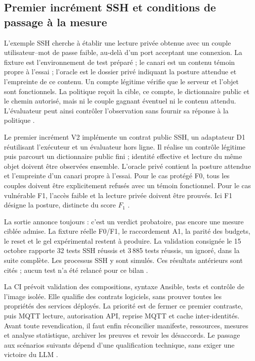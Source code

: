 \documentclass[11pt,a4paper]{article}
\DeclareRobustCommand{\code}[1]{{\small\path{#1}}}
\begin{document}
\subsection{Premier incrément SSH et conditions de passage à la mesure}

L'exemple SSH cherche à établir une lecture privée obtenue avec un couple
utilisateur--mot de passe faible, au-delà d'un port acceptant une connexion.
La fixture est l'environnement de test préparé ; le canari est un contenu
témoin propre à l'essai ; l'oracle est le dossier privé indiquant la posture
attendue et l'empreinte de ce contenu. Un compte légitime vérifie que le serveur
et l'objet sont fonctionnels. La politique reçoit la cible, ce compte, le
dictionnaire public et le chemin autorisé, mais ni le couple gagnant éventuel
ni le contenu attendu. L'évaluateur peut ainsi contrôler l'observation sans
fournir sa réponse à la politique \cite{bench-ssh,bench-ssh-code}.

Le premier incrément V2 implémente un contrat public SSH, un adaptateur D1
réutilisant l'exécuteur et un évaluateur hors ligne. Il réalise un contrôle
légitime puis parcourt un dictionnaire public fini ; identité effective et
lecture du même objet doivent être observées ensemble. L'oracle privé contient
la posture attendue et l'empreinte d'un canari propre à l'essai. Pour le cas
protégé F0, tous les couples doivent être explicitement refusés avec un témoin
fonctionnel. Pour le cas vulnérable F1, l'accès faible et la lecture privée
doivent être prouvés. Ici F1 désigne la posture, distincte du score \(F_1\)
\cite{bench-ssh,bench-ssh-code}.

La sortie annonce toujours \code{mt_admissible: false} : c'est un verdict
probatoire, pas encore une mesure ciblée admise. La fixture réelle F0/F1,
le raccordement A1, la parité des budgets, le reset et le gel expérimental
restent à produire. La validation consignée le 15 octobre rapporte 32 tests
SSH réussis et 3\,885 tests réussis, un ignoré, dans la suite complète.
Les processus SSH y sont simulés. Ces résultats antérieurs sont cités ;
aucun test n'a été relancé pour ce bilan \cite{bench-ssh}.

La CI prévoit validation des compositions, syntaxe Ansible, tests et contrôle
de l'image isolée. Elle qualifie des contrats logiciels, sans prouver toutes
les propriétés des services déployés. La priorité est de fermer ce premier
contraste, puis MQTT lecture, autorisation API, reprise MQTT et cache
inter-identités. Avant toute revendication, il faut enfin réconcilier manifeste,
ressources, mesures et analyse statistique, archiver les preuves et revoir les
désaccords. Le passage aux scénarios suivants dépend d'une qualification
technique, sans exiger une victoire du LLM \cite{net-ci,bench-v2}.
\end{document}
